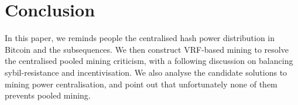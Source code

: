 \section{Conclusion}

In this paper, we reminds people the centralised hash power distribution in Bitcoin and the subsequences.
We then construct VRF-based mining to resolve the centralised pooled mining criticism,
with a following discussion on balancing sybil-resistance and incentivisation.
We also analyse the candidate solutions to mining power centralisation, and point out that unfortunately none of them prevents pooled mining.
